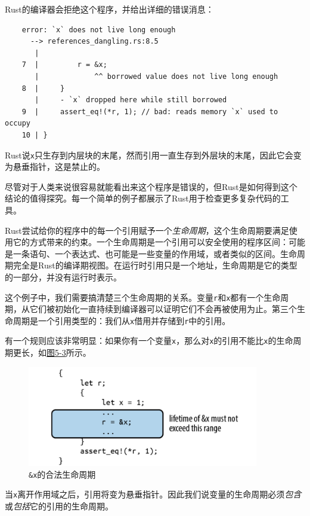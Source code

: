 Rust的编译器会拒绝这个程序，并给出详细的错误消息：
\begin{verbatim}
    error: `x` does not live long enough
      --> references_dangling.rs:8.5
       |
    7  |         r = &x;
       |             ^^ borrowed value does not live long enough
    8  |     }
       |     - `x` dropped here while still borrowed
    9  |     assert_eq!(*r, 1); // bad: reads memory `x` used to occupy
    10 | }
\end{verbatim}

Rust说\texttt{x}只生存到内层块的末尾，然而引用一直生存到外层块的末尾，因此它会变为悬垂指针，这是禁止的。

尽管对于人类来说很容易就能看出来这个程序是错误的，但Rust是如何得到这个结论的值得探究。每一个简单的例子都展示了Rust用于检查更多复杂代码的工具。

Rust尝试给你的程序中的每一个引用赋予一个\emph{生命周期}，这个生命周期要满足使用它的方式带来的约束。一个生命周期是一个引用可以安全使用的程序区间：可能是一条语句、一个表达式、也可能是一些变量的作用域，或者类似的区间。生命周期完全是Rust的编译期视图。在运行时引用只是一个地址，生命周期是它的类型的一部分，并没有运行时表示。

这个例子中，我们需要搞清楚三个生命周期的关系。变量\texttt{r}和\texttt{x}都有一个生命周期，从它们被初始化一直持续到编译器可以证明它们不会再被使用为止。第三个生命周期是一个引用类型的：我们从\texttt{x}借用并存储到\texttt{r}中的引用。

有一个规则应该非常明显：如果你有一个变量\texttt{x}，那么对\texttt{x}的引用不能比\texttt{x}的生命周期更长，如\hyperref[f5-3]{图5-3}所示。

\begin{figure}[htbp]
    \centering
    \includegraphics[width=0.9\textwidth]{../img/f5-3.png}
    \caption{\texttt{\&x}的合法生命周期}
    \label{f5-3}
\end{figure}

当\texttt{x}离开作用域之后，引用将变为悬垂指针。因此我们说变量的生命周期必须\emph{包含}或\emph{包括}它的引用的生命周期。

